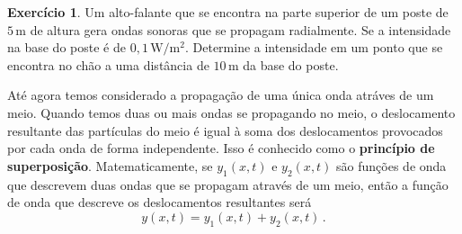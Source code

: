 \documentclass[twocolumn=on,fontsize=12pt,DIV=calc]{scrartcl}
\theoremstyle{definition}
\newtheorem{ex}{Exercício}[section]
\begin{document}
\begin{ex}
  Um alto-falante que se encontra na parte superior de um poste de
  $5\,\mathrm{m}$ de altura gera ondas sonoras que se propagam
  radialmente. Se a intensidade na base do poste é de
  $0{,}1\, \mathrm{W/m^2}$. Determine a intensidade em um ponto que se
  encontra no chão a uma distância de $10\,\mathrm{m}$ da base do
  poste.
\end{ex}

Até agora temos considerado a propagação de uma única onda atráves de
um meio. Quando temos duas ou mais ondas se propagando no meio, o
deslocamento resultante das partículas do meio é igual à soma dos
deslocamentos provocados por cada onda de forma independente. Isso é
conhecido como o \textbf{princípio de superposição}. Matematicamente,
se $y_1(x,t)$ e $y_2(x,t)$ são funções de onda que descrevem duas
ondas que se propagam através de um meio, então a função de onda que
descreve os deslocamentos resultantes será
$$y(x,t)=y_1(x,t)+y_2(x,t)\,.$$
\end{document}
